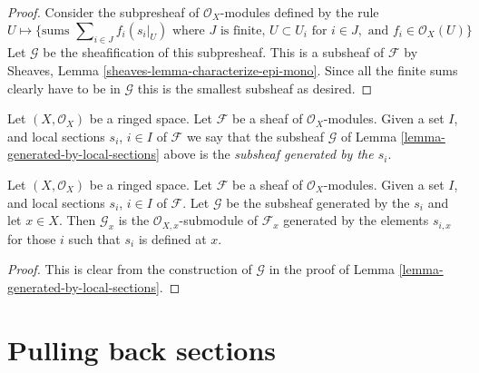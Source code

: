 \begin{proof}
Consider the subpresheaf of $\mathcal{O}_X$-modules
defined by the rule
$$
U
\longmapsto
\{
\text{sums } \sum\nolimits_{i \in J} f_i (s_i|_U)
\text{ where } J \text{ is finite, }
U \subset U_i \text{ for } i\in J, \text{ and }
f_i \in \mathcal{O}_X(U)
\}
$$
Let $\mathcal{G}$ be the sheafification of this subpresheaf.
This is a subsheaf of $\mathcal{F}$ by
Sheaves, Lemma \ref{sheaves-lemma-characterize-epi-mono}.
Since all the finite sums clearly have to be in $\mathcal{G}$
this is the smallest subsheaf as desired.
\end{proof}

\begin{definition}
\label{definition-generated-by-local-sections}
Let $(X, \mathcal{O}_X)$ be a ringed space.
Let $\mathcal{F}$ be a sheaf of $\mathcal{O}_X$-modules.
Given a set $I$, and
local sections $s_i$, $i \in I$ of $\mathcal{F}$
we say that the subsheaf $\mathcal{G}$ of
Lemma \ref{lemma-generated-by-local-sections}
above is the {\it subsheaf generated by the $s_i$}.
\end{definition}

\begin{lemma}
\label{lemma-generated-by-local-sections-stalk}
Let $(X, \mathcal{O}_X)$ be a ringed space.
Let $\mathcal{F}$ be a sheaf of $\mathcal{O}_X$-modules.
Given a set $I$, and
local sections $s_i$, $i \in I$ of $\mathcal{F}$.
Let $\mathcal{G}$ be the subsheaf generated by the
$s_i$ and let $x\in X$.
Then $\mathcal{G}_x$ is the $\mathcal{O}_{X, x}$-submodule of
$\mathcal{F}_x$ generated by the elements $s_{i, x}$
for those $i$ such that $s_i$ is defined at $x$.
\end{lemma}

\begin{proof}
This is clear from the construction of $\mathcal{G}$
in the proof of Lemma \ref{lemma-generated-by-local-sections}.
\end{proof}





\section{Pulling back sections}
\label{section-pullback-section}

